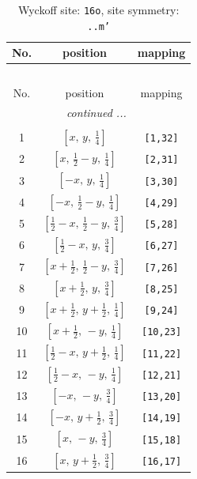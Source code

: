 \documentclass[fleqn,8pt]{jsarticle}
\begin{document}
\renewcommand{\arraystretch}{1.2}
\begin{longtable}{ccc}
\caption{Wyckoff site: {\tt 16o}, site symmetry: {\tt ..m'}}
 \\
 \hline \hline
No. & position & mapping \\ \hline \endfirsthead

\multicolumn{2}{l}{\tablename\ \thetable{}} \\
 \hline \hline
No. & position & mapping \\ \hline \endhead

 \hline \hline
\multicolumn{2}{r}{\footnotesize\it continued ...} \\ \endfoot

 \hline \hline
\multicolumn{2}{r}{} \\ \endlastfoot

1 & $\left[ x,\, y,\, \frac{1}{4} \right]$ & {\tt [1,32]} \\ \hline
2 & $\left[ x,\, \frac{1}{2} - y,\, \frac{1}{4} \right]$ & {\tt [2,31]} \\ \hline
3 & $\left[ - x,\, y,\, \frac{1}{4} \right]$ & {\tt [3,30]} \\ \hline
4 & $\left[ - x,\, \frac{1}{2} - y,\, \frac{1}{4} \right]$ & {\tt [4,29]} \\ \hline
5 & $\left[ \frac{1}{2} - x,\, \frac{1}{2} - y,\, \frac{3}{4} \right]$ & {\tt [5,28]} \\ \hline
6 & $\left[ \frac{1}{2} - x,\, y,\, \frac{3}{4} \right]$ & {\tt [6,27]} \\ \hline
7 & $\left[ x + \frac{1}{2},\, \frac{1}{2} - y,\, \frac{3}{4} \right]$ & {\tt [7,26]} \\ \hline
8 & $\left[ x + \frac{1}{2},\, y,\, \frac{3}{4} \right]$ & {\tt [8,25]} \\ \hline
9 & $\left[ x + \frac{1}{2},\, y + \frac{1}{2},\, \frac{1}{4} \right]$ & {\tt [9,24]} \\ \hline
10 & $\left[ x + \frac{1}{2},\, - y,\, \frac{1}{4} \right]$ & {\tt [10,23]} \\ \hline
11 & $\left[ \frac{1}{2} - x,\, y + \frac{1}{2},\, \frac{1}{4} \right]$ & {\tt [11,22]} \\ \hline
12 & $\left[ \frac{1}{2} - x,\, - y,\, \frac{1}{4} \right]$ & {\tt [12,21]} \\ \hline
13 & $\left[ - x,\, - y,\, \frac{3}{4} \right]$ & {\tt [13,20]} \\ \hline
14 & $\left[ - x,\, y + \frac{1}{2},\, \frac{3}{4} \right]$ & {\tt [14,19]} \\ \hline
15 & $\left[ x,\, - y,\, \frac{3}{4} \right]$ & {\tt [15,18]} \\ \hline
16 & $\left[ x,\, y + \frac{1}{2},\, \frac{3}{4} \right]$ & {\tt [16,17]} \\
\end{longtable}
\end{document}
